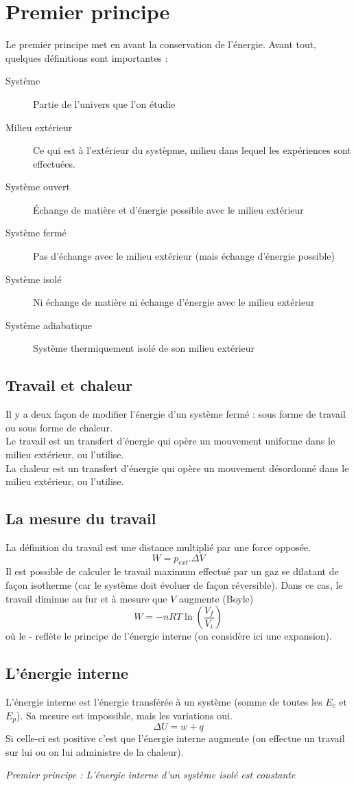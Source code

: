 \documentclass	[11pt, a4paper, openany]{book}
\begin{document}
\section{Premier principe}
Le premier principe met en avant la conservation de l'énergie. Avant tout, quelques définitions sont importantes : 
\begin{description}
	\item[Système] Partie de l'univers que l'on étudie
	\item[Milieu extérieur] Ce qui est à l'extérieur du systèpme, milieu dans lequel les expériences sont effectuées.
	\item[Système ouvert] Échange de matière et d'énergie possible avec le milieu extérieur
	\item[Système fermé] Pas d'échange avec le milieu extérieur (mais échange d'énergie possible)
	\item[Système isolé] Ni échange de matière ni échange d'énergie avec le milieu extérieur
	\item[Système adiabatique] Système thermiquement isolé de son milieu extérieur
\end{description}
\subsection{Travail et chaleur}
Il y a deux façon de modifier l'énergie d'un système fermé : sous forme de travail ou sous forme de chaleur.\\
Le travail est un transfert d'énergie qui opère un mouvement uniforme dans le milieu extérieur, ou l'utilise.\\
La chaleur est un transfert d'énergie qui opère un mouvement désordonné dans le milieu extérieur, ou l'utilise.

\subsection{La mesure du travail}
La définition du travail est une distance multiplié par une force opposée.
$$W = p_{ext}.\Delta V$$
Il est possible de calculer le travail maximum effectué par un gaz se dilatant de façon isotherme (car le système doit évoluer de façon réversible). Dans ce cas, le travail diminue au fur et à mesure que $V$ augmente (Boyle)
$$W = -nRT\ln\left(\frac{V_f}{V_i}\right)$$
où le - reflète le principe de l'énergie interne (on considère ici une expansion).

\subsection{L'énergie interne}
L'énergie interne est l'énergie transférée à un système (somme de toutes les $E_c$ et $E_p$). Sa mesure est impossible, mais les variations oui.
$$\Delta U = w + q$$
Si celle-ci est positive c'est que l'énergie interne augmente (on effectue un travail sur lui ou on lui administre de la chaleur).
\begin{center}
	\textit{Premier principe : L'énergie interne d'un système isolé est constante}
\end{center}
\end{document}
